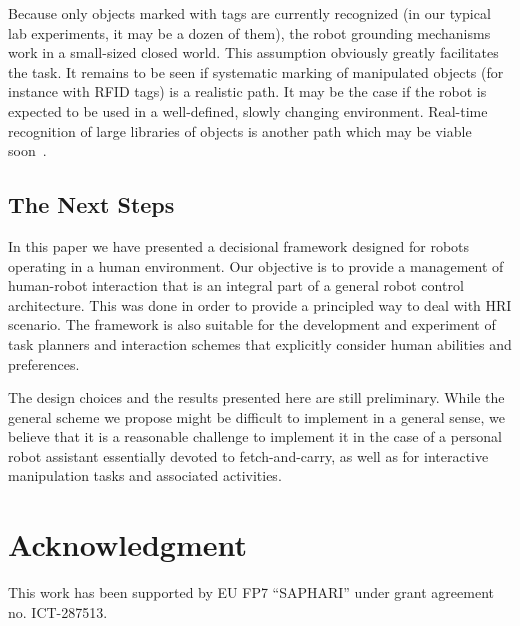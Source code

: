 \documentclass[preprint,5p]{elsarticle}
\begin{document}
Because only objects marked with tags are currently recognized (in our typical
lab experiments, it may be a dozen of them), the robot grounding mechanisms work
in a small-sized closed world. This assumption obviously greatly facilitates
the task. It remains to be seen if systematic marking of manipulated objects
(for instance with RFID tags) is a realistic path. It may be the case if the
robot is expected to be used in a well-defined, slowly changing environment.
Real-time recognition of large libraries of objects is another path which may
be viable soon~\cite{Dean2013Fast}.


\subsection{The Next Steps}


In this paper we have presented a decisional framework designed for
robots operating in a human environment. Our objective is to provide a
management of human-robot interaction that is an integral part of a
general robot control architecture.  This was done in order to provide
a principled way to deal with HRI scenario.  The framework is also
suitable for the development and experiment of task planners and
interaction schemes that explicitly consider human abilities and
preferences.

The design choices and the results presented here are still preliminary.
While the general scheme we propose might be difficult to implement in
a general sense, we believe that it is a reasonable challenge to
implement it in the case of a personal robot assistant essentially
devoted to fetch-and-carry, as well as for interactive manipulation
tasks and associated activities.



\section*{Acknowledgment}

This work has been supported by EU FP7 ``SAPHARI'' under grant agreement no. ICT-287513.


%

\end{document}
